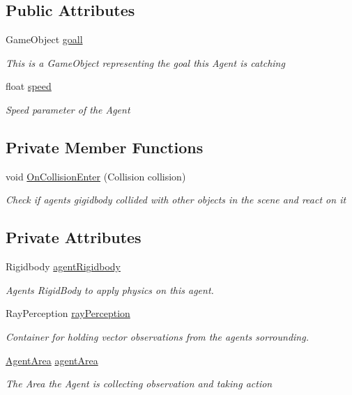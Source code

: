 \subsection*{Public Attributes}
\begin{DoxyCompactItemize}
\item 
Game\+Object \mbox{\hyperlink{class_catcher_agent_a5158fa0d75280a5131037cd20d7e3afd}{goall}}
\begin{DoxyCompactList}\small\item\em This is a Game\+Object representing the goal this Agent is catching \end{DoxyCompactList}\item 
float \mbox{\hyperlink{class_catcher_agent_a90d294825b74176926dfee484ab56af8}{speed}}
\begin{DoxyCompactList}\small\item\em Speed parameter of the Agent \end{DoxyCompactList}\end{DoxyCompactItemize}
\subsection*{Private Member Functions}
\begin{DoxyCompactItemize}
\item 
void \mbox{\hyperlink{class_catcher_agent_a16a95360c49d63206557576218ca42d2}{On\+Collision\+Enter}} (Collision collision)
\begin{DoxyCompactList}\small\item\em Check if agents gigidbody collided with other objects in the scene and react on it \end{DoxyCompactList}\end{DoxyCompactItemize}
\subsection*{Private Attributes}
\begin{DoxyCompactItemize}
\item 
Rigidbody \mbox{\hyperlink{class_catcher_agent_a2e5c259c9930c0d93aac6b64177c95c1}{agent\+Rigidbody}}
\begin{DoxyCompactList}\small\item\em Agents Rigid\+Body to apply physics on this agent. \end{DoxyCompactList}\item 
Ray\+Perception \mbox{\hyperlink{class_catcher_agent_af0211765225d989587ca410ac3124662}{ray\+Perception}}
\begin{DoxyCompactList}\small\item\em Container for holding vector observations from the agents sorrounding. \end{DoxyCompactList}\item 
\mbox{\hyperlink{class_agent_area}{Agent\+Area}} \mbox{\hyperlink{class_catcher_agent_a92d790163f19c9d8ba3fb5655be02575}{agent\+Area}}
\begin{DoxyCompactList}\small\item\em The Area the Agent is collecting observation and taking action \end{DoxyCompactList}\end{DoxyCompactItemize}


